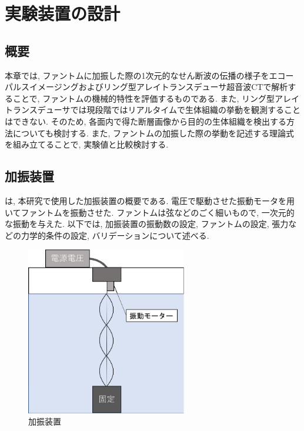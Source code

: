 \chapter{実験装置の設計}
\newpage
\section{概要}
本章では, ファントムに加振した際の1次元的なせん断波の伝播の様子をエコーパルスイメージングおよびリング型アレイトランスデューサ超音波CTで解析することで, ファントムの機械的特性を評価するものである. また, リング型アレイトランスデューサでは現段階ではリアルタイムで生体組織の挙動を観測することはできない. そのため, 各面内で得た断層画像から目的の生体組織を検出する方法についても検討する. また, ファントムの加振した際の挙動を記述する理論式を組み立てることで, 実験値と比較検討する.
\section{加振装置}
は, 本研究で使用した加振装置の概要である. 電圧で駆動させた振動モータを用いてファントムを振動させた. ファントムは弦などのごく細いもので, 一次元的な振動を与えた. 以下では, 加振装置の振動数の設定, ファントムの設定, 張力などの力学的条件の設定, バリデーションについて述べる. 
\begin{figure}[H]
  \begin{center}
    \includegraphics[width=70mm]{fig/jikkensouchi.pdf}
  \end{center}
  \caption{加振装置}
\end{figure}
